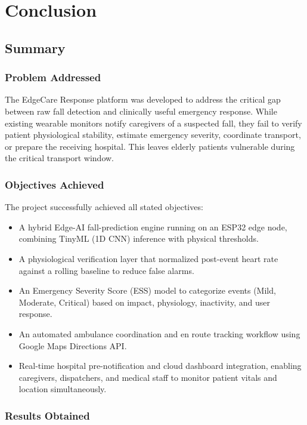 \chapter{Conclusion}

\section[Summary]{\textbf{Summary}}

\subsection{Problem Addressed}

The EdgeCare Response platform was developed to address the critical gap between raw fall detection and clinically useful emergency response. While existing wearable monitors notify caregivers of a suspected fall, they fail to verify patient physiological stability, estimate emergency severity, coordinate transport, or prepare the receiving hospital. This leaves elderly patients vulnerable during the critical transport window.

\subsection{Objectives Achieved}

The project successfully achieved all stated objectives:
\begin{itemize}
\item A hybrid Edge-AI fall-prediction engine running on an ESP32 edge node, combining TinyML (1D CNN) inference with physical thresholds.
\item A physiological verification layer that normalized post-event heart rate against a rolling baseline to reduce false alarms.
\item An Emergency Severity Score (ESS) model to categorize events (Mild, Moderate, Critical) based on impact, physiology, inactivity, and user response.
\item An automated ambulance coordination and en route tracking workflow using Google Maps Directions API.
\item Real-time hospital pre-notification and cloud dashboard integration, enabling caregivers, dispatchers, and medical staff to monitor patient vitals and location simultaneously.
\end{itemize}

\subsection{Results Obtained}

